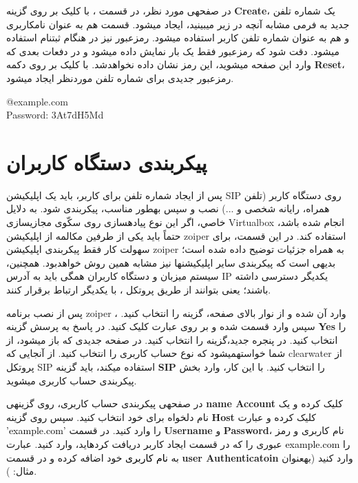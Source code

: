 در صفحه\nf ی مورد نظر، در قسمت ، با کلیک بر روی گزینه \textbf{Create}، یک شماره تلفن جدید به فرمی مشابه آنچه در زیر می\nf بینید، ایجاد می\nf شود. قسمت  هم به عنوان نام\nf کاربری و هم به عنوان شماره تلفن کاربر استفاده می\nf شود. رمزعبور نیز در هنگام ثبت\nf نام  استفاده می\nf شود. دقت شود که رمزعبور فقط یک بار نمایش داده می\nf شود و در دفعات بعدی که وارد این صفحه می\nf شوید، این رمز نشان داده نخواهدشد. با کلیک بر روی دکمه \textbf{Reset}، رمزعبور جدیدی برای شماره تلفن موردنظر ایجاد می\nf شود.

\begin{latin}
\setlength{\parindent}{0ex}
@example.com\\
\noindent Password: 3At7dH5Md
\end{latin}

\section{پیکربندی  دستگاه کاربران}
\label{zoiperconf}

پس از ایجاد شماره تلفن برای کاربر، باید یک اپلیکیشن SIP روی دستگاه کاربر (تلفن همراه، رایانه شخصی و ...) نصب و سپس به\nf طور مناسب، پیکربندی شود. به دلایل خاصي، اگر این نوع پیاده\nf سازی روی سکّوی مجازی\nf سازی Virtualbox انجام شده باشد، حتماً باید یکی از طرفین مکالمه از اپلیکیشن zoiper استفاده کند. در این قسمت، برای سهولت کار فقط پیکربندی اپلیکیشن zoiper به همراه جزئیات توضیح داده شده است؛ بدیهی است که پیکربندی سایر اپلیکیشن\nf ها نیز مشابه همین روش خواهدبود. همچنین، سیستم میزبان و دستگاه کاربران همگی باید به آدرس IP یکدیگر دسترسی داشته باشند؛ یعنی بتوانند از طریق پروتکل ، با یکدیگر ارتباط برقرار کنند.

پس از نصب برنامه zoiper ، وارد آن شده و از نوار بالای صفحه، گزینه  را انتخاب کنید. سپس وارد قسمت  شده و بر روی عبارت  کلیک کنید. در پاسخ به پرسش  گزینه \textbf{Yes} را انتخاب کنید. در پنجره جدید،گزینه  را انتخاب کنید. در صفحه جدیدی که باز می\nf شود، از شما خواسته\nf می\nf شود که نوع حساب کاربری را انتخاب کنید. از آنجایی که clearwater از پروتکل SIP استفاده میکند، باید گزینه \textbf{SIP} را انتخاب کنید. با این کار، وارد بخش پیکربندی حساب کاربری می\nf شوید.
 
در صفحه\nf ی پیکربندی حساب کاربری، روی گزینه\nf ی \textbf{name Account} کلیک کرده و یک نام دلخواه برای خود انتخاب کنید. سپس روی گزینه \textbf{Host} کلیک کرده و عبارت \textcolor{black}{'example.com'} را وارد کنید. در قسمت \textbf{Username} و \textbf{Password}، نام کاربری و رمز عبوری را که در قسمت ایجاد کاربر دریافت کرده\nf اید، وارد کنید. عبارت \textcolor{black}{example.com} را به \textcolor{black}{نام کاربری} خود اضافه کرده و در قسمت \textbf{user Authenticatoin} وارد کنید (به\nf عنوان مثال: ).

